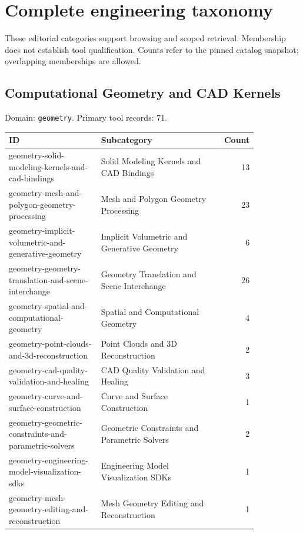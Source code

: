 \section{Complete engineering taxonomy}
These editorial categories support browsing and scoped retrieval. Membership does not establish tool qualification. Counts refer to the pinned catalog snapshot; overlapping memberships are allowed.
\subsection{Computational Geometry and CAD Kernels}
\noindent Domain: \texttt{geometry}. Primary tool records: 71.
\begin{longtable}{p{0.37\linewidth}p{0.47\linewidth}r}
ID & Subcategory & Count\\\hline\endhead
geometry-solid-modeling-kernels-and-cad-bindings & Solid Modeling Kernels and CAD Bindings & 13\\
geometry-mesh-and-polygon-geometry-processing & Mesh and Polygon Geometry Processing & 23\\
geometry-implicit-volumetric-and-generative-geometry & Implicit Volumetric and Generative Geometry & 6\\
geometry-geometry-translation-and-scene-interchange & Geometry Translation and Scene Interchange & 26\\
geometry-spatial-and-computational-geometry & Spatial and Computational Geometry & 4\\
geometry-point-clouds-and-3d-reconstruction & Point Clouds and 3D Reconstruction & 2\\
geometry-cad-quality-validation-and-healing & CAD Quality Validation and Healing & 3\\
geometry-curve-and-surface-construction & Curve and Surface Construction & 1\\
geometry-geometric-constraints-and-parametric-solvers & Geometric Constraints and Parametric Solvers & 2\\
geometry-engineering-model-visualization-sdks & Engineering Model Visualization SDKs & 1\\
geometry-mesh-geometry-editing-and-reconstruction & Mesh Geometry Editing and Reconstruction & 1\\
\end{longtable}
